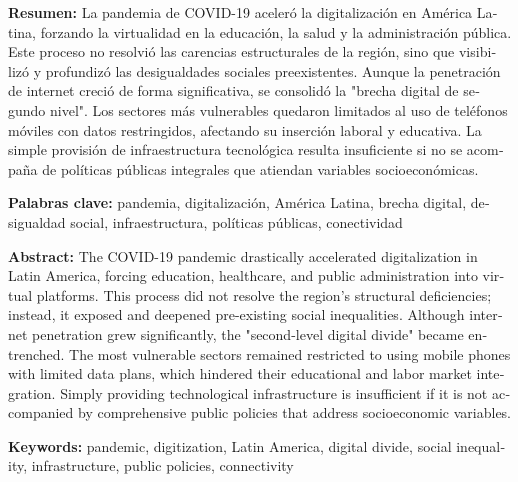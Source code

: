 \documentclass{article}
\begin{document}
\begin{tcolorbox}[colback=brown!8!white,colframe=brown!8!white,boxrule=0pt,arc=2pt,left=4pt,right=4pt,top=3pt,bottom=3pt,before skip=4pt,after skip=4pt]
\begin{otherlanguage}{spanish}
\sffamily\small \textbf{Resumen:} La pandemia de COVID-19 aceleró la digitalización en América Latina, forzando la virtualidad en la educación, la salud y la administración pública. Este proceso no resolvió las carencias estructurales de la región, sino que visibilizó y profundizó las desigualdades sociales preexistentes. Aunque la penetración de internet creció de forma significativa, se consolidó la "brecha digital de segundo nivel". Los sectores más vulnerables quedaron limitados al uso de teléfonos móviles con datos restringidos, afectando su inserción laboral y educativa. La simple provisión de infraestructura tecnológica resulta insuficiente si no se acompaña de políticas públicas integrales que atiendan variables socioeconómicas.
\par\smallskip\noindent\textbf{Palabras clave:} pandemia, digitalización, América Latina, brecha digital, desigualdad social, infraestructura, políticas públicas, conectividad
\end{otherlanguage}
\end{tcolorbox}

\begin{tcolorbox}[colback=brown!8!white,colframe=brown!8!white,boxrule=0pt,arc=2pt,left=4pt,right=4pt,top=3pt,bottom=3pt,before skip=4pt,after skip=4pt]
\begin{otherlanguage}{english}
\sffamily\small \textbf{Abstract:} The COVID-19 pandemic drastically accelerated digitalization in Latin America, forcing education, healthcare, and public administration into virtual platforms. This process did not resolve the region's structural deficiencies; instead, it exposed and deepened pre-existing social inequalities. Although internet penetration grew significantly, the "second-level digital divide" became entrenched. The most vulnerable sectors remained restricted to using mobile phones with limited data plans, which hindered their educational and labor market integration. Simply providing technological infrastructure is insufficient if it is not accompanied by comprehensive public policies that address socioeconomic variables.
\par\smallskip\noindent\textbf{Keywords:} pandemic, digitization, Latin America, digital divide, social inequality, infrastructure, public policies, connectivity
\end{otherlanguage}
\end{tcolorbox}
\end{document}
